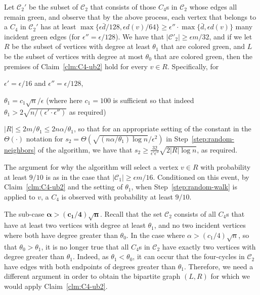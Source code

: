 \documentclass{article}
\newcommand{\eps}{\epsilon}
\newcommand{\calC}{{\mathcal{C}}}
\begin{document}
Let $\calC_2'$  be the subset of  $\calC_2$ that consists of those $C_4$s in $\calC_2$ whose edges all remain green, and observe that by the above process, each vertex that belongs to a $C_4$ in $\calC_2'$ has at least $\max\{\eps \bar{d}/128,\eps d(v)/64\}\geq \eps''\cdot \max\{\bar{d},\eps d(v)\}$ many incident green edges (for $\eps''=\eps/128$). 
We have that $|\calC'_2| \geq \eps m/32$, and if we let $R$ be the subset of vertices with degree at least $\theta_1$ that are colored green, and $L$ be the subset of vertices with degree at most $\theta_0$ that are colored green, then the premises of Claim~\ref{clm:C4-ub2} hold for every $v\in R$.
Specifically, for
\begin{inparaenum}[(1)]
    \item $\eps'=\eps/16$ and $\eps''=\eps/128$,
    \item $\theta_1=c_1\sqrt n/\eps$ (where here $c_1 = 100$ is sufficient so that indeed $\theta_1>2\sqrt{n/(\eps'\cdot \eps'')}$ as required)
    \item $|R|\leq 2m/\theta_1\leq 2n\alpha/\theta_1 $,
    so that for an appropriate setting of the constant in the $\Theta(\cdot)$ notation for $s_2=\Theta(\sqrt{  (n\alpha/\theta_1)\log n}/\eps^2)$ in Step~\ref{step:random-neighbors} of the algorithm, we have that
    $s_2 \geq \frac{32}{\eps' \eps''}\sqrt{2|R|\log n}$, as required. 
\end{inparaenum}

The argument for why the algorithm will select a vertex $v\in R$ with  probability at least $9/10$ is as in the case that $|\calC_1| \geq \eps m/16$. Conditioned on this event, by Claim~\ref{clm:C4-ub2} and the setting of $\theta_1$, when Step~\ref{step:random-walk} is applied to $v$, a $C_4$ is observed with probability at least $9/10$.


\smallskip\noindent
\textsf{The sub-case $\mathbf{\alpha> (c_1/4)\sqrt n}$.}
Recall that the set $\calC_2$ consists of all $C_4$s that have at least two vertices with degree at least $\theta_1$, and no two incident vertices where both have degree greater than $\theta_0$.
In the case where $\alpha>(c_1/4)\sqrt n$, so that $\theta_0>\theta_1$, it is no longer true that all $C_4$s  in $\calC_2$ have exactly two vertices with degree greater than $\theta_1$. Indeed, as $\theta_1<\theta_0$, it can occur that the four-cycles in $\calC_2$ have edges with both endpoints of degrees greater than $\theta_1$. Therefore, we need a different argument in order to obtain the bipartite graph $(L,R)$ for which we would apply Claim~\ref{clm:C4-ub2}.
\end{document}
